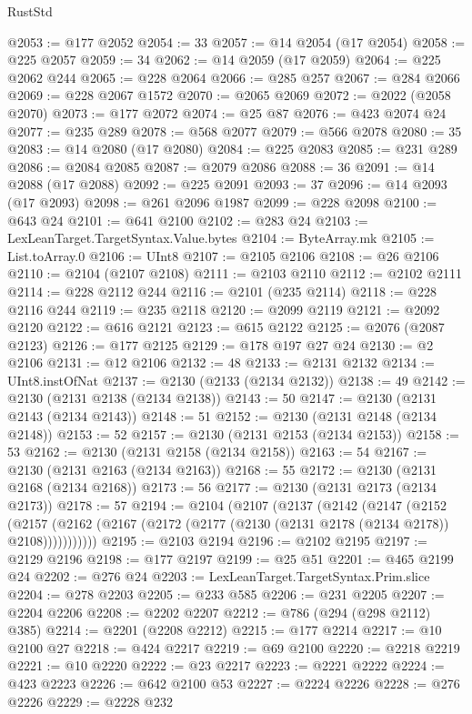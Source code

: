 \begin{lexlean}{RustStd}
\begin{coremodule}
@2053 := @177 @2052
@2054 := 33
@2057 := @14 @2054 (@17 @2054)
@2058 := @225 @2057
@2059 := 34
@2062 := @14 @2059 (@17 @2059)
@2064 := @225 @2062 @244
@2065 := @228 @2064
@2066 := @285 @257
@2067 := @284 @2066
@2069 := @228 @2067 @1572
@2070 := @2065 @2069
@2072 := @2022 (@2058 @2070)
@2073 := @177 @2072
@2074 := @25 @87
@2076 := @423 @2074 @24
@2077 := @235 @289
@2078 := @568 @2077
@2079 := @566 @2078
@2080 := 35
@2083 := @14 @2080 (@17 @2080)
@2084 := @225 @2083
@2085 := @231 @289
@2086 := @2084 @2085
@2087 := @2079 @2086
@2088 := 36
@2091 := @14 @2088 (@17 @2088)
@2092 := @225 @2091
@2093 := 37
@2096 := @14 @2093 (@17 @2093)
@2098 := @261 @2096 @1987
@2099 := @228 @2098
@2100 := @643 @24
@2101 := @641 @2100
@2102 := @283 @24
@2103 := LexLeanTarget.TargetSyntax.Value.bytes
@2104 := ByteArray.mk
@2105 := List.toArray.{0}
@2106 := UInt8
@2107 := @2105 @2106
@2108 := @26 @2106
@2110 := @2104 (@2107 @2108)
@2111 := @2103 @2110
@2112 := @2102 @2111
@2114 := @228 @2112 @244
@2116 := @2101 (@235 @2114)
@2118 := @228 @2116 @244
@2119 := @235 @2118
@2120 := @2099 @2119
@2121 := @2092 @2120
@2122 := @616 @2121
@2123 := @615 @2122
@2125 := @2076 (@2087 @2123)
@2126 := @177 @2125
@2129 := @178 @197 @27 @24
@2130 := @2 @2106
@2131 := @12 @2106
@2132 := 48
@2133 := @2131 @2132
@2134 := UInt8.instOfNat
@2137 := @2130 (@2133 (@2134 @2132))
@2138 := 49
@2142 := @2130 (@2131 @2138 (@2134 @2138))
@2143 := 50
@2147 := @2130 (@2131 @2143 (@2134 @2143))
@2148 := 51
@2152 := @2130 (@2131 @2148 (@2134 @2148))
@2153 := 52
@2157 := @2130 (@2131 @2153 (@2134 @2153))
@2158 := 53
@2162 := @2130 (@2131 @2158 (@2134 @2158))
@2163 := 54
@2167 := @2130 (@2131 @2163 (@2134 @2163))
@2168 := 55
@2172 := @2130 (@2131 @2168 (@2134 @2168))
@2173 := 56
@2177 := @2130 (@2131 @2173 (@2134 @2173))
@2178 := 57
@2194 := @2104
    (@2107
      (@2137
        (@2142
          (@2147
            (@2152
              (@2157 (@2162 (@2167 (@2172 (@2177 (@2130 (@2131 @2178 (@2134 @2178)) @2108)))))))))))
@2195 := @2103 @2194
@2196 := @2102 @2195
@2197 := @2129 @2196
@2198 := @177 @2197
@2199 := @25 @51
@2201 := @465 @2199 @24
@2202 := @276 @24
@2203 := LexLeanTarget.TargetSyntax.Prim.slice
@2204 := @278 @2203
@2205 := @233 @585
@2206 := @231 @2205
@2207 := @2204 @2206
@2208 := @2202 @2207
@2212 := @786 (@294 (@298 @2112) @385)
@2214 := @2201 (@2208 @2212)
@2215 := @177 @2214
@2217 := @10 @2100 @27
@2218 := @424 @2217
@2219 := @69 @2100
@2220 := @2218 @2219
@2221 := @10 @2220
@2222 := @23 @2217
@2223 := @2221 @2222
@2224 := @423 @2223
@2226 := @642 @2100 @53
@2227 := @2224 @2226
@2228 := @276 @2226
@2229 := @2228 @232

\end{coremodule}
\end{lexlean}
